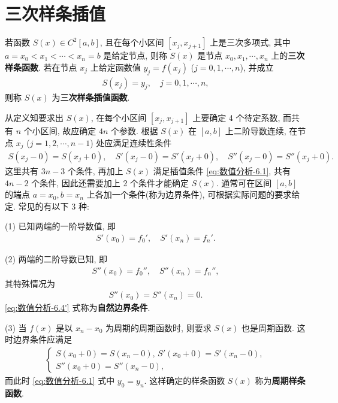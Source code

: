 \documentclass[../../main.tex]{subfiles}
\begin{document}
\section{三次样条插值}

\begin{definition}[三次样条函数]
若函数 $S(x) \in C^2[a, b]$, 且在每个小区间 $[x_j, x_{j + 1}]$ 上是三次多项式, 其中 $a = x_0 < x_1 < \cdots < x_n = b$ 是给定节点, 则称 $S(x)$ 是节点 $x_0, x_1, \cdots, x_n$ 上的\textbf{三次样条函数}. 若在节点 $x_j$ 上给定函数值 $y_j = f(x_j)$ ($j = 0, 1, \cdots, n$), 并成立
\begin{align}
S(x_j) = y_j, \quad j = 0, 1, \cdots, n, \label{eq:数值分析-6.1}
\end{align}
则称 $S(x)$ 为\textbf{三次样条插值函数}.
\end{definition}
\begin{remark}
从定义知要求出 $S(x)$, 在每个小区间 $[x_j, x_{j + 1}]$ 上要确定 4 个待定系数, 而共有 $n$ 个小区间, 故应确定 $4n$ 个参数. 根据 $S(x)$ 在 $[a, b]$ 上二阶导数连续, 在节点 $x_j$ ($j = 1, 2, \cdots, n - 1$) 处应满足连续性条件
\begin{align}
S(x_j - 0) = S(x_j + 0), \quad S'(x_j - 0) = S'(x_j + 0), \quad S''(x_j - 0) = S''(x_j + 0). \label{eq:数值分析-6.2}
\end{align}
这里共有 $3n - 3$ 个条件, 再加上 $S(x)$ 满足插值条件 \eqref{eq:数值分析-6.1}, 共有 $4n - 2$ 个条件, 因此还需要加上 2 个条件才能确定 $S(x)$. 通常可在区间 $[a, b]$ 的端点 $a = x_0, b = x_n$ 上各加一个条件(称为边界条件), 可根据实际问题的要求给定. 常见的有以下 3 种:

(1) 已知两端的一阶导数值, 即
\begin{align}
S'(x_0) = f_0', \quad S'(x_n) = f_n'. \label{eq:数值分析-6.3}
\end{align}

(2) 两端的二阶导数已知, 即
\begin{align}
S''(x_0) = f_0'', \quad S''(x_n) = f_n'', \label{eq:数值分析-6.4}
\end{align}
其特殊情况为
\begin{align}
S''(x_0) = S''(x_n) = 0. \label{eq:数值分析-6.4'}
\end{align}
\eqref{eq:数值分析-6.4'} 式称为\textbf{自然边界条件}.

(3) 当 $f(x)$ 是以 $x_n - x_0$ 为周期的周期函数时, 则要求 $S(x)$ 也是周期函数. 这时边界条件应满足
\begin{align}
\begin{cases}
S(x_0 + 0) = S(x_n - 0), \, S'(x_0 + 0) = S'(x_n - 0), \\
S''(x_0 + 0) = S''(x_n - 0),
\end{cases} \label{eq:数值分析-6.5}
\end{align}
而此时 \eqref{eq:数值分析-6.1} 式中 $y_0 = y_n$. 这样确定的样条函数 $S(x)$ 称为\textbf{周期样条函数}.
\end{remark}
\end{document}
